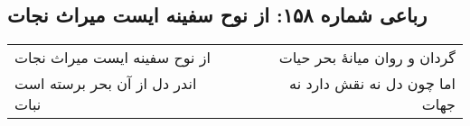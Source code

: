 \begin{center}
\section*{رباعی شماره ۱۵۸: از نوح سفینه ایست میراث نجات}
\label{sec:0158}
\begin{longtable}{l p{0.5cm} r}
از نوح سفینه ایست میراث نجات
&&
گردان و روان میانهٔ بحر حیات
\\
اندر دل از آن بحر برسته است نبات
&&
اما چون دل نه نقش دارد نه جهات
\\
\end{longtable}
\end{center}
